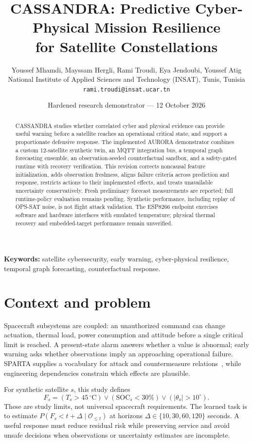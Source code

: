 \documentclass[10pt,a4paper,twocolumn]{article}
\title{\color{navy}CASSANDRA: Predictive Cyber-Physical Mission Resilience\\for Satellite Constellations}
\author{\small Youssef Mhamdi, Mayssam Hergli, Rami Troudi, Eya Jendoubi, Youssef Atig\\
\small National Institute of Applied Sciences and Technology (INSAT), Tunis, Tunisia\\
\small\texttt{rami.troudi@insat.ucar.tn}}
\date{Hardened research demonstrator --- 12 October 2026}
\begin{document}
\maketitle
\begin{abstract}
CASSANDRA studies whether correlated cyber and physical evidence can provide useful warning before a satellite reaches an operational critical state, and support a proportionate defensive response. The implemented AURORA demonstrator combines a custom 12-satellite synthetic twin, an MQTT integration bus, a temporal graph forecasting ensemble, an observation-seeded counterfactual sandbox, and a safety-gated runtime with recovery verification. This revision corrects noncausal feature initialization, adds observation freshness, aligns failure criteria across prediction and response, restricts actions to their implemented effects, and treats unavailable uncertainty conservatively. Fresh preliminary forecast measurements are reported; full runtime-policy evaluation remains pending. Synthetic performance, including replay of OPS-SAT noise, is not flight attack validation. The ESP8266 endpoint exercises software and hardware interfaces with emulated temperature; physical thermal recovery and embedded-target performance remain unverified.
\end{abstract}
\noindent\textbf{Keywords:} satellite cybersecurity, early warning, cyber-physical resilience, temporal graph forecasting, counterfactual response.

\section{Context and problem}
Spacecraft subsystems are coupled: an unauthorized command can change actuation, thermal load, power consumption and attitude before a single critical limit is reached. A present-state alarm answers whether a value is abnormal; early warning asks whether observations imply an approaching operational failure. SPARTA supplies a vocabulary for attack and countermeasure relations~\cite{sparta}, while engineering dependencies constrain which effects are plausible.

For synthetic satellite $s$, this study defines
\begin{equation}
 F_s = (T_s>45\,^{\circ}\mathrm{C})\lor(\mathrm{SOC}_s<30\%)\lor(|\theta_s|>10^{\circ}).
\end{equation}
These are study limits, not universal spacecraft requirements. The learned task is to estimate $P(F_s<t+\Delta\mid\mathcal O_{\leq t})$ at horizons $\Delta\in\{10,30,60,120\}$ seconds. A useful response must reduce residual risk while preserving service and avoid unsafe decisions when observations or uncertainty estimates are incomplete.
\end{document}
